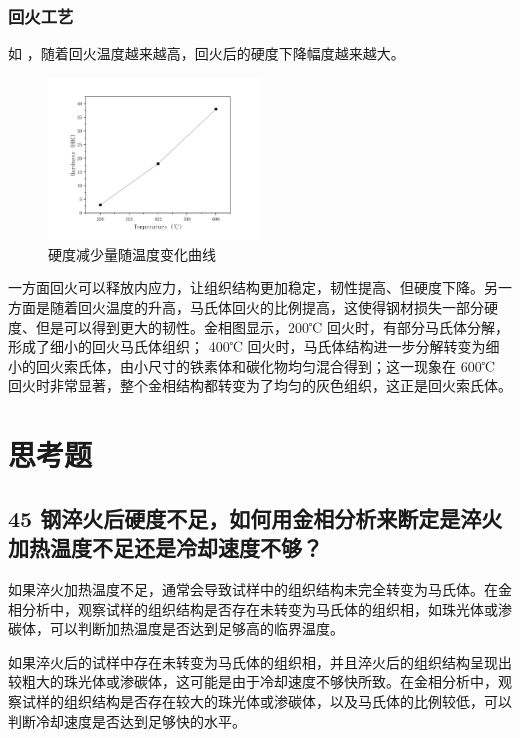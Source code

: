 \documentclass[a4paper,utf8]{article}
\begin{document}
        \subsubsection{回火工艺}
            如  ，随着回火温度越来越高，回火后的硬度下降幅度越来越大。\par
            \begin{figure}
                \caption{硬度减少量随温度变化曲线\label{fig2}}
                \includegraphics[width=0.5\textwidth]{exp_img/fig2.pdf}
            \end{figure}\par
            一方面回火可以释放内应力，让组织结构更加稳定，韧性提高、但硬度下降。另一方面是随着回火温度的升高，马氏体回火的比例提高，这使得钢材损失一部分硬度、但是可以得到更大的韧性。金相图显示，200℃ 回火时，有部分马氏体分解，形成了细小的回火马氏体组织； 400℃ 回火时，马氏体结构进一步分解转变为细小的回火索氏体，由小尺寸的铁素体和碳化物均匀混合得到；这一现象在 600℃ 回火时非常显著，整个金相结构都转变为了均匀的灰色组织，这正是回火索氏体。
\section{思考题}
    \subsection{45 钢淬火后硬度不足，如何用金相分析来断定是淬火加热温度不足还是冷却速度不够？}
        如果淬火加热温度不足，通常会导致试样中的组织结构未完全转变为马氏体。在金相分析中，观察试样的组织结构是否存在未转变为马氏体的组织相，如珠光体或渗碳体，可以判断加热温度是否达到足够高的临界温度。\par
        如果淬火后的试样中存在未转变为马氏体的组织相，并且淬火后的组织结构呈现出较粗大的珠光体或渗碳体，这可能是由于冷却速度不够快所致。在金相分析中，观察试样的组织结构是否存在较大的珠光体或渗碳体，以及马氏体的比例较低，可以判断冷却速度是否达到足够快的水平。
\end{document}
